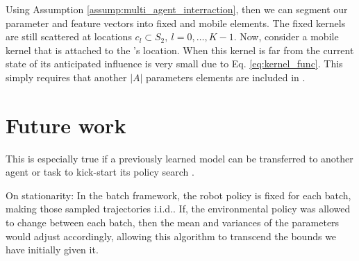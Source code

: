     Using Assumption \ref{assump:multi_agent_interraction}, then we can segment our parameter and feature vectors into
    fixed and mobile elements. The fixed kernels are still scattered at locations $c_l \subset S_2,\ l=0,\ldots,K-1$.
    Now, consider a mobile kernel that is attached to the \!'s location. When this kernel is far from the
    current state of  its anticipated influence is very small due to Eq. \ref{eq:kernel_func}. This simply
    requires that another $|A|$ parameters elements are included in \paramVec.


\section{Future work}
    This is especially true if a previously learned model can be transferred to another agent or task to kick-start its
    policy search \colorbox{yellow}{\cite{killian2017robust}}.


    On stationarity: In the batch framework, the robot policy is fixed for each batch, making those sampled trajectories
    i.i.d.. If, the environmental policy was allowed to change between each batch, then the mean and variances of the
    parameters would adjust accordingly, allowing this algorithm to transcend the bounds we have initially given it.

